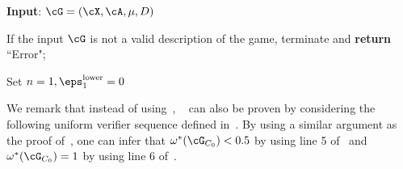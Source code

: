  \vspace{10pt}
 \IncMargin{1em}
 \begin{algorithm}[H]
 	\DontPrintSemicolon
 	
 	\textbf{Input}: $\cG = (\cX, \cA, \mu, D)$
 	
 	If the input $\cG$ is not a valid description of the game, terminate and \textbf{return} ``Error"; 
 	
 	Set $n = 1, \eps_1^{\text{lower}}  = 0$
 	
 	\caption{The description for $\texttt{Searchsamevalue}_{\delta}$.}
 	\label{pseu:searchsamevalue}
 \end{algorithm}\DecMargin{1em}
 \vspace{10pt} 


We remark that instead of using~, ~ can also be proven by considering the following uniform verifier sequence defined in~. By using a similar argument as the proof of~, one can infer that $\omega^*(\cG_{C_0}) < 0.5$ by using line 5 of~ and $\omega^*(\cG_{C_0}) = 1$ by using line 6 of~. 

